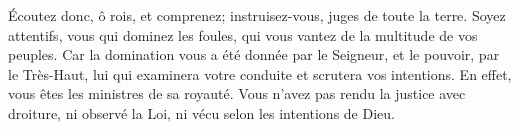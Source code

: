 Écoutez donc, ô rois, et comprenez;
	instruisez-vous, juges de toute la terre.
Soyez attentifs, vous qui dominez les foules,
	qui vous vantez de la multitude de vos peuples.
Car la domination vous a été donnée par le Seigneur, et le pouvoir, par le Très-Haut,
	lui qui examinera votre conduite et scrutera vos intentions.
En effet, vous êtes les ministres de sa royauté.
Vous n’avez pas rendu la justice avec droiture,
	ni observé la Loi, ni vécu selon les intentions de Dieu.
